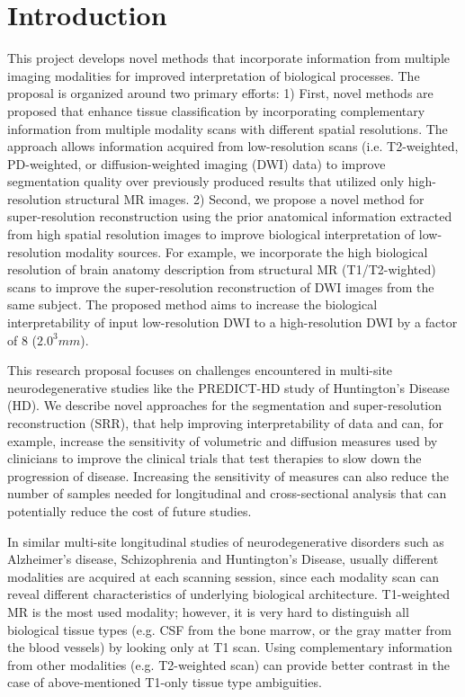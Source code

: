 
\section{Introduction}
\label{section:Introduction}

This project develops novel methods that incorporate information from multiple imaging modalities for improved interpretation of biological processes.  The proposal is organized around two primary efforts:
%
1) First, novel methods are proposed that enhance tissue classification by incorporating complementary information from multiple modality scans with different spatial resolutions.  The approach allows information acquired from low-resolution scans (i.e. T2-weighted, PD-weighted, or diffusion-weighted imaging (DWI) data) to improve segmentation quality over previously produced results that utilized only high-resolution structural MR images.
%
2) Second, we propose a novel method for super-resolution reconstruction using the prior anatomical information extracted from high spatial resolution images to improve biological interpretation of low-resolution  modality sources.  For example, we incorporate the high biological resolution of brain anatomy description from structural MR (T1/T2-wighted) scans to improve the super-resolution reconstruction of DWI images from the same subject. The proposed method aims to increase the biological interpretability of input low-resolution DWI to a high-resolution DWI by a factor of 8 ($2.0^{3}mm$).

This research proposal focuses on challenges encountered in multi-site neurodegenerative studies like the PREDICT-HD \cite{PREDICTHD} study of Huntington's Disease (HD).  We describe novel approaches for the segmentation and super-resolution reconstruction (SRR), that help improving interpretability of data and can, for example, increase the sensitivity of volumetric and diffusion measures used by clinicians to improve the clinical trials that test therapies to slow down the progression of disease. Increasing the sensitivity of measures can also reduce the number of samples needed for longitudinal and cross-sectional analysis that can potentially reduce the cost of future studies. 

In similar multi-site longitudinal studies of neurodegenerative disorders such as Alzheimer's disease, Schizophrenia and Huntington's Disease, usually different modalities are acquired at each scanning session, since each modality scan can reveal different characteristics of underlying biological architecture. T1-weighted MR is the most used modality; however, it is very hard to distinguish all biological tissue types (e.g. CSF from the bone marrow, or the gray matter from the blood vessels) by looking only at T1 scan. Using complementary information from other modalities (e.g. T2-weighted scan) can provide better contrast in the case of above-mentioned T1-only tissue type ambiguities.

